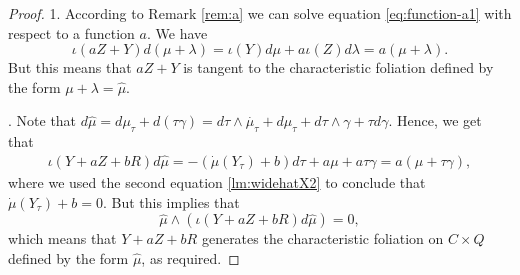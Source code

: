 \documentclass[12pt]{amsart}
\theoremstyle{plain}
\theoremstyle{definition}
\theoremstyle{remark}
\newcommand{\wh}{\widehat}
\begin{document}
\begin{proof}
1. According to Remark \ref{rem:a} we can solve equation \eqref{eq:function-a1} with respect to a function $a$.
 We  have  $$\iota(aZ+ Y)d (\mu + \lambda) = \iota(Y)d\mu   +a\iota(Z) d \lambda =a(\mu+\lambda).$$
 But this means that $aZ+Y$ is tangent to the characteristic foliation defined by the form $\mu+\lambda=\wh\mu$.
  
 
 

.  
 Note that $d \wh\mu = d \mu_{\tau} + d (\tau \gamma)  = d \tau \wedge \dot{\mu_{\tau}} + d \mu_{\tau} + d \tau \wedge \gamma  +  \tau d \gamma.$ Hence, we get that 
\begin{align*} \iota(Y+aZ+bR)d \wh\mu =-(\dot\mu(Y_\tau)+b)d\tau+a\mu+a\tau\gamma=a(\mu+\tau\gamma),
\end{align*}
where 
we used the  second equation \eqref{lm:widehatX2} to conclude that $\dot\mu(Y_\tau)+b=0$.
But  this implies that $$\wh\mu\wedge  \left(\iota( Y+aZ+bR)d\wh\mu\right)=0,$$ which means that  $Y+aZ+bR$ generates the characteristic foliation on $C\times Q$ defined by the form $\wh\mu$, as required.
 
\end{proof}
\end{document}
